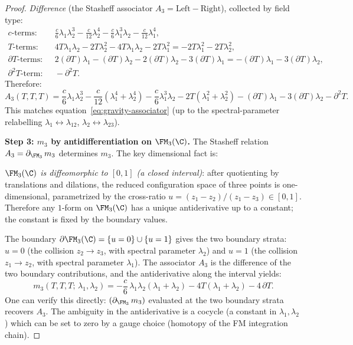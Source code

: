 \begin{proof}
\emph{Difference} (the Stasheff associator
$A_3 = \text{Left} - \text{Right}$), collected by field
type:
\begin{align*}
\text{$c$-terms:} &\quad
 \tfrac{c}{6}\lambda_1\lambda_2^3 - \tfrac{c}{12}\lambda_2^4
 - \tfrac{c}{6}\lambda_1^3\lambda_2 - \tfrac{c}{12}\lambda_1^4, \\
\text{$T$-terms:} &\quad
 4T\lambda_1\lambda_2 - 2T\lambda_2^2
 - 4T\lambda_1\lambda_2 - 2T\lambda_1^2
 = -2T\lambda_1^2 - 2T\lambda_2^2, \\
\text{$\partial T$-terms:} &\quad
 2(\partial T)\lambda_1 - (\partial T)\lambda_2
 - 2(\partial T)\lambda_2 - 3(\partial T)\lambda_1
 = -(\partial T)\lambda_1 - 3(\partial T)\lambda_2, \\
\text{$\partial^2 T$-term:} &\quad -\partial^2 T.
\end{align*}
Therefore:
\begin{equation}%
\boxed{
A_3(T,T,T)
= \frac{c}{6}\lambda_1\lambda_2^3
- \frac{c}{12}(\lambda_1^4 + \lambda_2^4)
- \frac{c}{6}\lambda_1^3\lambda_2
- 2T(\lambda_1^2 + \lambda_2^2)
- (\partial T)\lambda_1
- 3(\partial T)\lambda_2
- \partial^2 T.
}
\end{equation}
This matches equation~\eqref{eq:gravity-associator}
\textup{(}up to the spectral-parameter relabelling
$\lambda_1 \leftrightarrow \lambda_{12}$,
$\lambda_2 \leftrightarrow \lambda_{23}$\textup{)}.

\medskip
\textbf{Step 3: $m_3$ by antidifferentiation on $\FM_3(\C)$.}
The Stasheff relation $A_3 = \partial_{\FM_3}\, m_3$
determines $m_3$. The key dimensional fact is:

\emph{$\FM_3(\C)$ is diffeomorphic to $[0,1]$ (a closed
interval)}: after quotienting by translations and dilations,
the reduced configuration space of three points is
one-dimensional, parametrized by the cross-ratio
$u = (z_1 - z_2)/(z_1 - z_3) \in [0,1]$. Therefore any
$1$-form on $\FM_3(\C)$ has a unique antiderivative up to a
constant; the constant is fixed by the boundary values.

The boundary $\partial\FM_3(\C) = \{u = 0\} \cup \{u = 1\}$
gives the two boundary strata:
$u = 0$ (the collision $z_2 \to z_3$, with spectral
parameter $\lambda_2$) and $u = 1$ (the collision
$z_1 \to z_2$, with spectral parameter $\lambda_1$).
The associator $A_3$ is the difference of the two boundary
contributions, and the antiderivative along the interval
yields:
\begin{equation}%
m_3(T,T,T;\, \lambda_1, \lambda_2)
= -\frac{c}{6}\,\lambda_1\lambda_2(\lambda_1 + \lambda_2)
- 4T(\lambda_1 + \lambda_2)
- 4\,\partial T.
\end{equation}
One can verify this directly: $(\partial_{\FM_3}\, m_3)$ evaluated at the two boundary strata recovers $A_3$. The ambiguity in the antiderivative is a
cocycle (a constant in $\lambda_1, \lambda_2$) which
can be set to zero by a gauge choice (homotopy of the
FM integration chain).


\end{proof}
